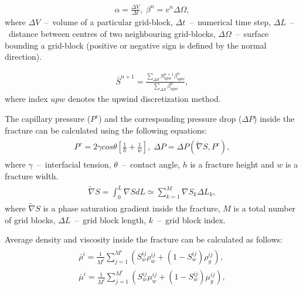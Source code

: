 \documentclass[a4paper,12pt]{extreport}
\begin{document}
  \begin{eqnarray}
  \label{eq:twophase_alpha_beta}
  \alpha = \frac{\Delta V}{\Delta t}, \;
  \beta^n = v^n\Delta \Omega,
  \end{eqnarray}
  where $\Delta V$~--~volume of a particular grid-block, $\Delta t$~--~numerical time step, $\Delta L$~--~distance between centres of two neighbouring grid-blocks, $\Delta \Omega$~--~surface bounding a grid-block (positive or negative sign is defined by the normal direction).

\begin{eqnarray}
\label{eq:twophase_delta_num}
\bar{S}^{n+\mathit 1} =\frac{\sum_{\Delta S}S_{upw}^{n+\mathit{1}}\beta^n_{upw}}{\sum_{\Delta S}\beta^n_{upw}},
\end{eqnarray}
 where index $upw$ denotes the upwind discretization method.
 
 The capillary pressure ($P^c$)  and the corresponding pressure drop ($\Delta P$) inside the fracture can be calculated using the following equations:
  \begin{eqnarray}
  \begin{gathered}
  \label{eq:twophase_capillary_pressure_fractures}
  P^{c} = 2 \gamma cos \theta \left[\frac{1}{h} + \frac{1}{w}\right], \; \Delta P = \Delta P \left(\tilde{\nabla} S, P^c\right),
  \end{gathered}
  \end{eqnarray}
  where $\gamma$~--~interfacial tension, $\theta$~--~contact angle, $h$ is a fracture height and $w$ is a fracture width.
  \begin{eqnarray}
  \label{eq:twophase_av_saturation_grad}
  \begin{gathered}
  \tilde{\nabla} S = \int_{0}^{L} \nabla S dL \simeq\sum_{k=1}^{M} \nabla S_{k} \Delta L_{k},
  \end{gathered}
  \end{eqnarray}
 where $\tilde{\nabla} S$ is a phase saturation gradient inside the fracture, $M$ is a total number of grid blocks, $\Delta L$~--~grid block length, $k$~--~grid block index.
 
 
Average density and viscosity inside the fracture can be calculated as follows:
  \begin{eqnarray}
  \label{eq:twophase_dens_visc}
  \begin{gathered}
  \bar{\rho}^i = \frac{1}{M^i}\sum_{j=1}^{M^i} \left(S_w^{ij} \rho^{ij}_w+ \left(1-S_w^{ij}\right) \rho^{ij}_g\right), \\
  \bar{\mu}^i = \frac{1}{M^i}\sum_{j=1}^{M^i} \left(S_w^{ij} \mu^{ij}_w+ \left(1-S_w^{ij}\right) \mu^{ij}_g\right),
  \end{gathered}
  \end{eqnarray}
  
\end{document}
